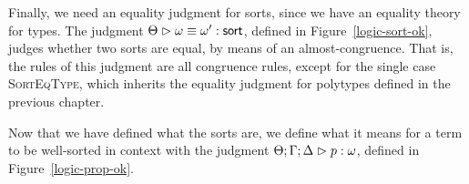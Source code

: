 Finally, we need an equality judgment for sorts, since we have an
equality theory for types. The judgment
${\Theta} \vartriangleright {\omega} \equiv {\omega'} : \mathsf{sort}$, defined in
Figure~\ref{logic-sort-ok}, judges whether two sorts are equal, by
means of an almost-congruence. That is, the rules of this judgment
are all congruence rules, except for the single case
\textsc{SortEqType}, which inherits the equality judgment for
polytypes defined in the previous chapter. 

Now that we have defined what the sorts are, we define what it means
for a term to be well-sorted in context with the judgment
${\Theta; \Gamma; \Delta} \vartriangleright {p} : {\omega}$, defined in Figure~\ref{logic-prop-ok}.

\begin{figure}
\end{figure}
